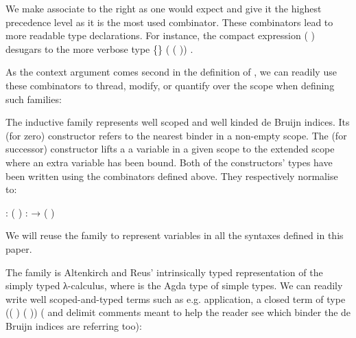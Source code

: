 We make  associate to the right as one would expect and give it the
highest precedence level as it is the most used combinator. These combinators
lead to more readable type declarations.  For instance, the compact expression
\AF{∀[}   (   )   \AF{]}
desugars to the more verbose type
 \{\}  (   ( ))   .

As the context argument comes second in the definition of , we
can readily use these combinators to thread, modify, or quantify over the
scope when defining such families:

\begin{minipage}[t]{0.35\textwidth}
\end{minipage}\hfill
\begin{minipage}[t]{0.55\textwidth}
\end{minipage}

The inductive family  represents well scoped and well kinded
de Bruijn indices. Its  (for zero) constructor refers to the
nearest binder in a non-empty scope. The  (for successor)
constructor lifts a a variable in a given scope to the extended scope
where an extra variable has been bound. Both of the constructors'
types have been written using the combinators defined above.  They
respectively normalise to:
\begin{center}
   : {      ( \AIC{::} )}
  \qquad
   : {    →       ( \AIC{::} )}
\end{center}
We will reuse the  family to represent variables in all the
syntaxes defined in this paper.

The   family  is Altenkirch and Reus'
intrinsically typed representation of the simply typed λ-calculus,
where  is the Agda type of simple types.  We can readily
write well scoped-and-typed terms such as e.g. application, a closed
term of type {((  )  ( 
  ))} (\AC{\{-} and \AC{-\}} delimit comments meant to help the
reader see which binder the de Bruijn indices are referring too):

